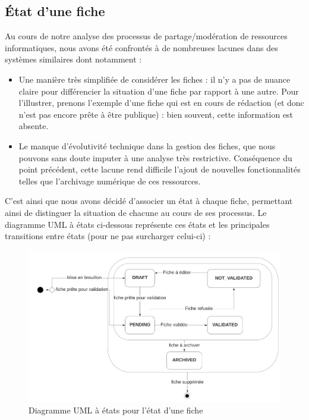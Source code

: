 \subsection*{État d'une \gls{fiche}}

Au cours de notre analyse des processus de partage/modération de ressources informatiques, nous avons été confrontés à de nombreuses lacunes dans des systèmes similaires dont notamment :
\begin{itemize}
    \item Une manière très simplifiée de considérer les \glspl{fiche} : il n'y a pas de nuance claire pour différencier la situation d'une \gls{fiche} par rapport à une autre. Pour l'illustrer, prenons l'exemple d'une \gls{fiche} qui est en cours de rédaction (et donc n'est pas encore prête à être publique) : bien souvent, cette information est absente.
    \item Le manque d'évolutivité technique dans la gestion des \glspl{fiche}, que nous pouvons sans doute imputer à une analyse très restrictive. Conséquence du point précédent, cette lacune rend difficile l'ajout de nouvelles fonctionnalités telles que l'archivage numérique de ces ressources. 
\end{itemize}

C'est ainsi que nous avons décidé d'associer un état à chaque \gls{fiche}, permettant ainsi de distinguer la situation de chacune au cours de ses processus. Le diagramme UML à états ci-dessous représente ces états et les principales transitions entre états (pour ne pas surcharger celui-ci) :

\begin{figure}[H]
    \includegraphics[width=\textwidth,height=\textheight,keepaspectratio]{images/StateFiches.png}
    \centering
    \caption{Diagramme UML à états pour l'état d'une \gls{fiche}}
    \label{pic:stateDiagramForFiches}
\end{figure}

